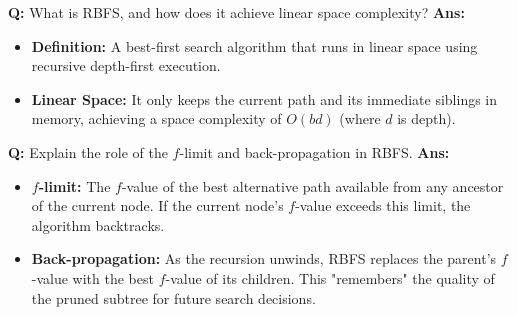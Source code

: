 \documentclass[10pt,a4paper,twocolumn]{article}
\begin{document}
\begin{tcolorbox}[
  colback=white,
  colframe=UnitColorFour,
  colbacktitle=gray!10!white,
  coltitle=black,
  fonttitle=\bfseries\sffamily\small,
  title={Unit IV $\bullet$ Card 12: Recursive Best-First Search (RBFS) (Q4.7)},
  boxrule=1.2pt,
  arc=2mm,
  outer arc=2mm,
  boxsep=1.5mm,
  top=1mm,
  bottom=1mm,
  left=1.5mm,
  right=1.5mm,
  before skip=2.5mm,
  after skip=2.5mm
]
\textbf{Q:} What is RBFS, and how does it achieve linear space complexity?
\tcbline
\textbf{Ans:} \begin{itemize}
  \item   \textbf{Definition:} A best-first search algorithm that runs in linear space using recursive depth-first execution.
  \item   \textbf{Linear Space:} It only keeps the current path and its immediate siblings in memory, achieving a space complexity of \textbf{$O(bd)$} (where $d$ is depth).
\end{itemize}
\end{tcolorbox}


\begin{tcolorbox}[
  colback=white,
  colframe=UnitColorFour,
  colbacktitle=gray!10!white,
  coltitle=black,
  fonttitle=\bfseries\sffamily\small,
  title={Unit IV $\bullet$ Card 13: RBFS f-limit \& Backtracking (Q4.7)},
  boxrule=1.2pt,
  arc=2mm,
  outer arc=2mm,
  boxsep=1.5mm,
  top=1mm,
  bottom=1mm,
  left=1.5mm,
  right=1.5mm,
  before skip=2.5mm,
  after skip=2.5mm
]
\textbf{Q:} Explain the role of the $f$-limit and back-propagation in RBFS.
\tcbline
\textbf{Ans:} \begin{itemize}
  \item   \textbf{$f$-limit:} The $f$-value of the best alternative path available from any ancestor of the current node. If the current node's $f$-value exceeds this limit, the algorithm backtracks.
  \item   \textbf{Back-propagation:} As the recursion unwinds, RBFS replaces the parent's $f$-value with the best $f$-value of its children. This "remembers" the quality of the pruned subtree for future search decisions.
\end{itemize}
\end{tcolorbox}
\end{document}
